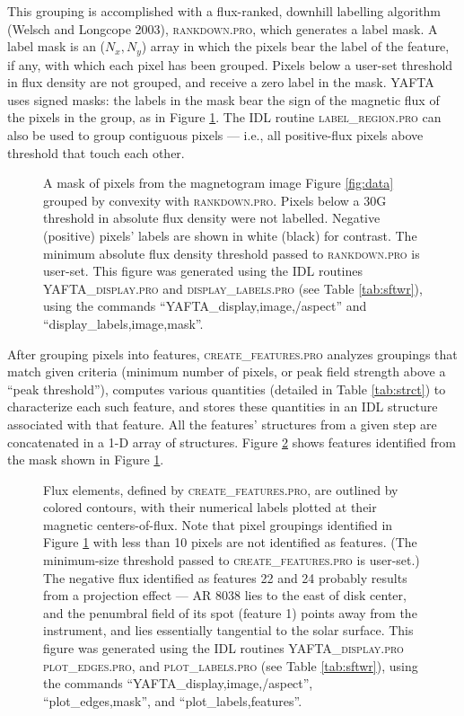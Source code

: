 \documentclass[12pt,preprint]{aastex}
\begin{document}
\noindent
This grouping is accomplished with a flux-ranked, downhill labelling
algorithm (Welsch and Longcope 2003), \nocite{Welsch2003}
\textsc{rankdown.pro}, which generates a label mask.  A label mask is an
($N_x, N_y$) array in which the pixels bear the label of the feature,
if any, with which each pixel has been grouped.  Pixels below a
user-set threshold in flux density are not grouped, and receive a zero
label in the mask.  \textsc{YAFTA} uses signed masks: the labels in
the mask bear the sign of the magnetic flux of the pixels in the
group, as in Figure \ref{fig:mask}.  The IDL routine
\textsc{label\_region.pro} can also be used to group contiguous pixels
--- i.e., all positive-flux pixels above threshold that touch each
other.

\begin{figure}
\caption{A mask of pixels from the magnetogram image Figure
\ref{fig:data} grouped by convexity with \textsc{rankdown.pro}.
Pixels below a 30G threshold in absolute flux density were not
labelled.  Negative (positive) pixels' labels are shown in white
(black) for contrast.  The minimum absolute flux density threshold passed to
\textsc{rankdown.pro} is user-set.  
This figure was generated using the IDL routines \textsc{YAFTA\_display.pro}
and \textsc{display\_labels.pro} (see Table \ref{tab:sftwr}), using the
commands ``YAFTA\_display,image,/aspect'' and ``display\_labels,image,mask''.
\label{fig:mask}}
\end{figure}
%

\noindent
After grouping pixels into features, \textsc{create\_features.pro}
analyzes groupings that match given criteria (minimum number of
pixels, or peak field strength above a ``peak threshold''), computes
various quantities (detailed in Table \ref{tab:strct}) to characterize
each such feature, and stores these quantities in an IDL structure
associated with that feature.  All the features' structures from a
given step are concatenated in a 1-D array of structures.  Figure
\ref{fig:label1} shows features identified from the mask shown in
Figure \ref{fig:mask}.

\begin{figure}
\caption{Flux elements, defined by \textsc{create\_features.pro}, are
outlined by colored contours, with their numerical labels plotted at
their magnetic centers-of-flux.  Note that pixel groupings identified
in Figure \ref{fig:mask} with less than 10 pixels are not identified
as features.  (The minimum-size threshold passed to
\textsc{create\_features.pro} is user-set.) The negative flux identified
as features 22 and 24 probably results from a projection effect --- AR
8038 lies to the east of disk center, and the penumbral field of its
spot (feature 1) points away from the instrument, and lies essentially
tangential to the solar surface. 
This figure was generated using the IDL routines \textsc{YAFTA\_display.pro}
\textsc{plot\_edges.pro}, and \textsc{plot\_labels.pro} (see Table
\ref{tab:sftwr}), using the commands ``YAFTA\_display,image,/aspect'',
``plot\_edges,mask'', and ``plot\_labels,features''.
\label{fig:label1}}
\end{figure}
%
\end{document}
